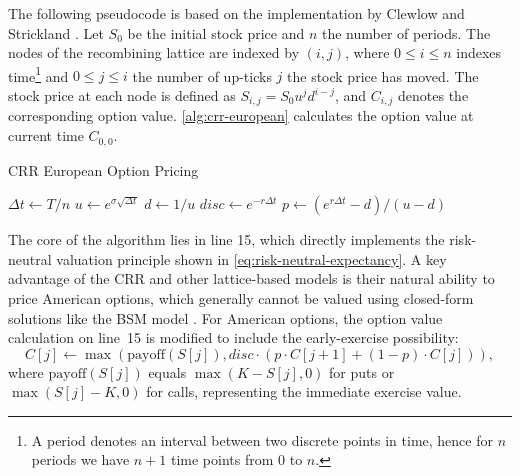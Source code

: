 \documentclass[english,12pt,a4paper,pdftex,sci,utf8]{aaltothesis}
\begin{document}
The following pseudocode is based on the implementation by Clewlow and Strickland \cite{clewlow1998implementing}. Let $S_0$ be the initial stock price and $n$ the number of periods. The nodes of the recombining lattice are indexed by $(i,j)$, where $0 \leq i \leq n$ indexes time\footnote{A period denotes an interval between two discrete points in time, hence for $n$ periods we have $n+1$ time points from $0$ to $n$.} and $0 \le j \le i$ the number of up-ticks $j$ the stock price has moved. The stock price at each node is defined as $S_{i,j} = S_0u^jd^{i-j}$, and $C_{i,j}$ denotes the corresponding option value. \cref{alg:crr-european} calculates the option value at current time $C_{0,0}$.

\begin{algorithm}
\LinesNumbered
\caption{CRR European Option Pricing}
\label{alg:crr-european}

$\Delta t \gets T/n$\;
$u \gets e^{\sigma\sqrt{\Delta t}}$\;
$d \gets 1/u$\;
$disc \gets e^{-r\Delta t}$\;
$p \gets (e^{r\Delta t} - d)/(u - d)$\;

\BlankLine
{}

\BlankLine
{}

\BlankLine
{}
 
\;
\end{algorithm}

The core of the algorithm lies in line 15, which directly implements the risk-neutral valuation principle shown in \cref{eq:risk-neutral-expectancy}. A key advantage of the CRR and other lattice-based models is their natural ability to price American options, which generally cannot be valued using closed-form solutions like the BSM model \cite{wilmott2013paul}. For American options, the option value calculation on line~15 is modified to include the early-exercise possibility:
\begin{equation*}
C[j] \gets \max(\text{payoff}(S[j]), disc \cdot (p \cdot C[j+1] + (1-p) \cdot C[j])),
\end{equation*}
where $\text{payoff}(S[j])$ equals $\max(K - S[j], 0)$ for puts or $\max(S[j] - K, 0)$ for calls, representing the immediate exercise value.
\end{document}
